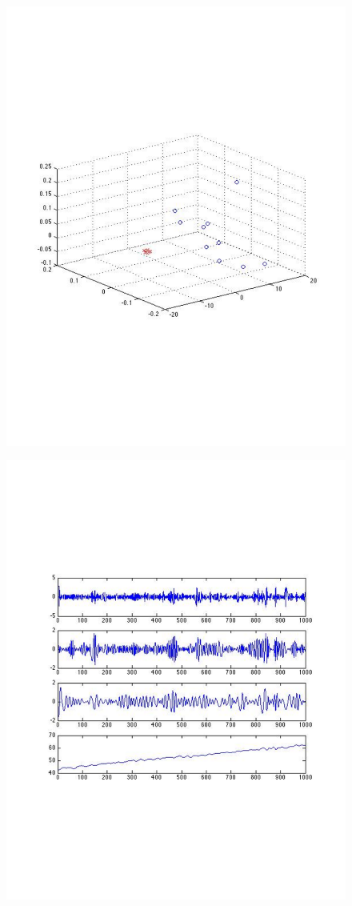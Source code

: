 \begin{figure}[t!] %
\centering
\includegraphics[width=0.75\columnwidth]{figs/EMD_LF_PCA_413_co2_light}
\caption{}
\label{fig:EMD_LF_PCA}
\end{figure}

\begin{figure}[t!] %
\centering
\includegraphics[width=0.75\columnwidth]{figs/KETI413_6h_light_3IMF}
\caption{}
\label{fig:light_3IMF}
\end{figure}


